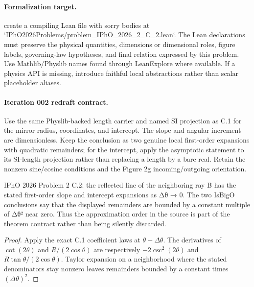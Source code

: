 \paragraph{Formalization target.}
create a compiling Lean file with sorry bodies at `IPhO2026Problems/problem\_IPhO\_2026\_2\_C\_2.lean`. The Lean declarations must preserve the physical quantities, dimensions or dimensional roles, figure labels, governing-law hypotheses, and final relation expressed by this problem.
Use Mathlib/Physlib names found through LeanExplore where available. If a physics API is missing, introduce faithful local abstractions rather than scalar placeholder aliases.

\paragraph{Iteration 002 redraft contract.}
Use the same Physlib-backed length carrier and named SI projection as C.1 for
the mirror radius, coordinates, and intercept.  The slope and angular
increment are dimensionless.  Keep the conclusion as two genuine local
first-order expansions with quadratic remainders; for the intercept, apply
the asymptotic statement to its SI-length projection rather than replacing a
length by a bare real.  Retain the nonzero sine/cosine conditions and the
Figure 2g incoming/outgoing orientation.

\begin{theorem}
  \label{thm:physics:IPhO_2026_2_C_2:target}
  IPhO 2026 Problem 2 C.2: the reflected line of the neighboring ray B has the stated first-order slope and intercept expansions as Δθ → 0. The two IsBigO conclusions say that the displayed remainders are bounded by a constant multiple of Δθ² near zero. Thus the approximation order in the source is part of the theorem contract rather than being silently discarded.
\end{theorem}
\begin{proof}
  Apply the exact C.1 coefficient laws at \(\theta+\Delta\theta\).  The
  derivatives of \(\cot(2\theta)\) and \(R/(2\cos\theta)\) are respectively
  \(-2\csc^2(2\theta)\) and
  \(R\tan\theta/(2\cos\theta)\).  Taylor expansion on a neighborhood where
  the stated denominators stay nonzero leaves remainders bounded by a constant
  times \((\Delta\theta)^2\).
\end{proof}
